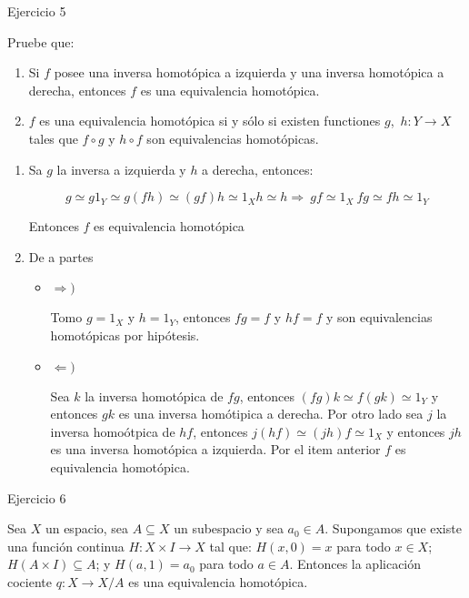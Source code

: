 \documentclass[11pt]{article}
\newenvironment{proof}[1][Demostraci\'on]{\begin{trivlist}
\item[\hskip \labelsep {\bfseries #1}]}{\end{trivlist}}
\newcommand{\qed}{\nobreak \ifvmode \relax \else
      \ifdim\lastskip<1.5em \hskip-\lastskip
      \hskip1.5em plus0em minus0.5em \fi \nobreak
      \vrule height0.75em width0.5em depth0.25em\fi}
\def \be{\begin{enumerate}}
\def \en{\end{enumerate}}
\begin{document}
\begin{enumerate}
\begin{proof}
\end{proof}

\item {Ejercicio 5}

Pruebe que:

\be
\item Si $f$ posee una inversa homot\'opica a izquierda y una inversa
homot\'opica a derecha, entonces $f$ es una equivalencia homot\'opica.

\item $f$ es una equivalencia homot\'opica si y s\'olo si
existen functiones $g$,~$h:Y\to X$ tales que $f\circ g$ y $h\circ f$ son
equivalencias homot\'opicas.

\en

\begin{proof}

\begin{enumerate}
\item Sa $g$ la inversa a izquierda y $h$ a derecha, entonces:

$$g \simeq g1_Y \simeq g(fh) \simeq (gf)h \simeq 1_X h \simeq h \Longrightarrow \ gf \simeq 1_X \ fg \simeq fh \simeq 1_Y$$

Entonces $f$ es equivalencia homot\'opica

\item {De a partes}

\begin{itemize}
\item $\Longrightarrow )$

Tomo $g=1_X$ y $h=1_Y$, entonces $fg = f$ y $hf = f$ y son equivalencias homot\'opicas por hip\'otesis.

\item{$\Longleftarrow )$}

Sea $k$ la inversa homot\'opica de $fg$, entonces $(fg)k \simeq f(gk) \simeq 1_Y$ y entonces $gk$ es una inversa hom\'otipica a derecha. Por otro lado sea $j$ la inversa homo\'otpica de $hf$, entonces $j(hf) \simeq (jh)f \simeq 1_X$ y entonces $jh$ es una inversa homot\'opica a izquierda. Por el item anterior $f$ es equivalencia homot\'opica. \qed

\end{itemize}

\end{enumerate}

\end{proof}

\item{Ejercicio 6}

Sea $X$ un espacio, sea $A\subseteq X$ un subespacio y sea $a_0\in
A$. Supongamos que existe una funci\'on continua $H:X\times I\to X$ tal que:
$H(x,0)=x$ para todo $x\in X$;$H(A\times
I)\subseteq A$; y  $H(a,1)=a_0$ para todo $a\in A$.
Entonces la aplicaci\'on cociente $q:X\to X/A$ es una equivalencia
homot\'opica.


\end{enumerate}
\end{document}
